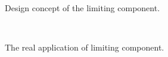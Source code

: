 \documentclass{article}
\begin{document}
\begin{figure}[H]
\centering
{}
\caption{Design concept of the limiting component.}
\end{figure}
~\\
\begin{figure}[H]
\centering
{}
\caption{The real application of limiting component.}
\end{figure}
~\\
\end{document}
